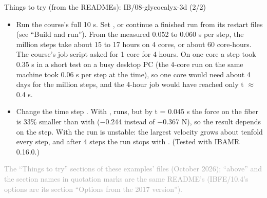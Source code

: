 \documentclass[aspectratio=169,11pt]{beamer}
\newcommand{\sourcecredit}[1]{\vfill\begin{flushright}\tiny\textcolor{DarkGray}{#1}\end{flushright}}
\begin{document}
\begin{frame}{Things to try (from the READMEs): IB/08-glycocalyx-3d (2/2)}
\scriptsize\setlength{\leftmargini}{5em}
\begin{itemize}\setlength{\itemsep}{1pt}
  \item[IB/08.4] Run the course's full 10 s. Set , or continue a finished run from its restart files (see ``Build and run''). From the measured 0.052 to 0.060 s per step, the million steps take about 15 to 17 hours on 4 cores, or about 60 core-hours. The course's job script asked for 1 core for 4 hours. On one core a step took 0.35 s in a short test on a busy desktop PC (the 4-core run on the same machine took 0.06 s per step at the time), so one core would need about 4 days for the million steps, and the 4-hour job would have reached only t $\approx$ 0.4 s.
  \item[IB/08.5] Change the time step . With ,  runs, but by t = 0.045 s the force on the fiber is 33\% smaller than with  ($-$0.244 instead of $-$0.367 N), so the result depends on the step. With  the run is unstable: the largest velocity grows about tenfold every step, and after 4 steps the run stops with . (Tested with IBAMR 0.16.0.)
\end{itemize}
\sourcecredit{The ``Things to try'' sections of these examples' \code{README.md} files (October 2026); ``above'' and the section names in quotation marks are the same README's (IBFE/10.4's options are its section ``Options from the 2017 version'').}
\end{frame}
\end{document}
